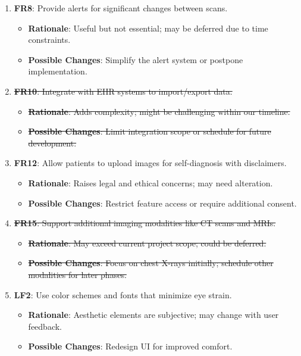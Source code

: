 \documentclass[12pt]{article}
\begin{document}
\begin{enumerate}[resume]
    \item \textbf{FR8}: Provide alerts for significant changes between scans.
    \begin{itemize}[label=-]
        \item \textbf{Rationale}: Useful but not essential; may be deferred due to time constraints.
        \item \textbf{Possible Changes}: Simplify the alert system or postpone implementation.
    \end{itemize}

    \item \sout{\textbf{FR10}: Integrate with EHR systems to import/export data.}
    \begin{itemize}[label=-]
        \item \sout{\textbf{Rationale}: Adds complexity; might be challenging within our timeline.}
        \item \sout{\textbf{Possible Changes}: Limit integration scope or schedule for future development.}
    \end{itemize}

    \item \textbf{FR12}: Allow patients to upload images for self-diagnosis with disclaimers.
    \begin{itemize}[label=-]
        \item \textbf{Rationale}: Raises legal and ethical concerns; may need alteration.
        \item \textbf{Possible Changes}: Restrict feature access or require additional consent.
    \end{itemize}

    \item \sout{\textbf{FR15}: Support additional imaging modalities like CT scans and MRIs.}
    \begin{itemize}[label=-]
        \item \sout{\textbf{Rationale}: May exceed current project scope; could be deferred.}
        \item \sout{\textbf{Possible Changes}: Focus on chest X-rays initially; schedule other modalities for later phases.}
    \end{itemize}

    \item \textbf{LF2}: Use color schemes and fonts that minimize eye strain.
    \begin{itemize}[label=-]
        \item \textbf{Rationale}: Aesthetic elements are subjective; may change with user feedback.
        \item \textbf{Possible Changes}: Redesign UI for improved comfort.
    \end{itemize}


\end{enumerate}
\end{document}
